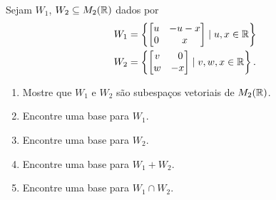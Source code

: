 \documentclass[12pt]{exam}
\begin{document}
    \begin{exercicio}
        Sejam $W_1$, $W_2 \subseteq M_2(\mathbb{R})$ dados por
        \begin{align*}
            W_1 &= \left\{
                        \begin{bmatrix}
                            u & -u -x\\
                            0 & x
                        \end{bmatrix}
                        \mid u, x \in \mathbb{R}
                    \right\}\\
            W_2 &= \left\{
                        \begin{bmatrix}
                            v & \phantom{x} 0\\
                            w & -x
                        \end{bmatrix}
                        \mid v, w, x \in \mathbb{R}
                    \right\}.
        \end{align*}

        \begin{enumerate}[label={\alph*})]

            \item Mostre que $W_1$ e $W_2$ são subespaços vetoriais de $M_2(\mathbb{R})$.

            \item Encontre uma base para $W_1$.

            \item Encontre uma base para $W_2$.

            \item Encontre uma base para $W_1 + W_2$.

            \item Encontre uma base para $W_1 \cap W_2$.
        \end{enumerate}
    \end{exercicio}
\end{document}
